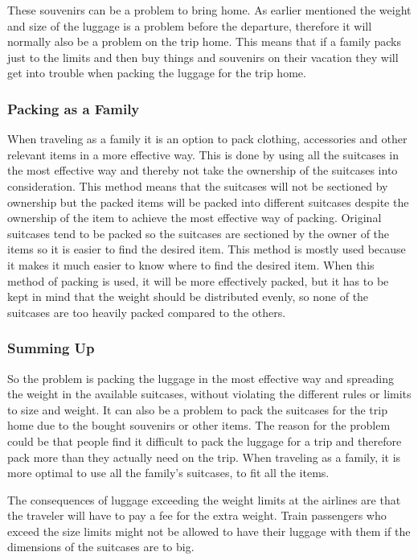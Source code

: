 These souvenirs can be a problem to bring home. As earlier mentioned the weight and size of the luggage is a problem before the departure, therefore it will normally also be a problem on the trip home.
This means that if a family packs just to the limits and then buy things and souvenirs on their vacation they will get into trouble when packing the luggage for the trip home.

\subsubsection{Packing as a Family}
When traveling as a family it is an option to pack clothing, accessories and other relevant items in a more effective way. This is done by using all the suitcases in the most effective way and thereby not take the ownership of the suitcases into consideration. This method means that the suitcases will not be sectioned by ownership but the packed items will be packed into different suitcases despite the ownership of the item to achieve the most effective way of packing. Original suitcases tend to be packed so the suitcases are sectioned by the owner of the items so it is easier to find the desired item. This method is mostly used because it makes it much easier to know where to find the desired item. When this method of packing is used, it will be more effectively packed, but it has to be kept in mind that the weight should be distributed evenly, so none of the suitcases are too heavily packed compared to the others.

\subsubsection{Summing Up}
So the problem is packing the luggage in the most effective way and spreading the weight in the available suitcases, without violating the different rules or limits to size and weight. It can also be a problem to pack the suitcases for the trip home due to the bought souvenirs or other items. The reason for the problem could be that people find it difficult to pack the luggage for a trip and therefore pack more than they actually need on the trip. When traveling as a family, it is more optimal to use all the family's suitcases, to fit all the items. 

The consequences of luggage exceeding the weight limits at the airlines are that the traveler will have to pay a fee for the extra weight.
Train passengers who exceed the size limits might not be allowed to have their luggage with them if the dimensions of the suitcases are to big.
